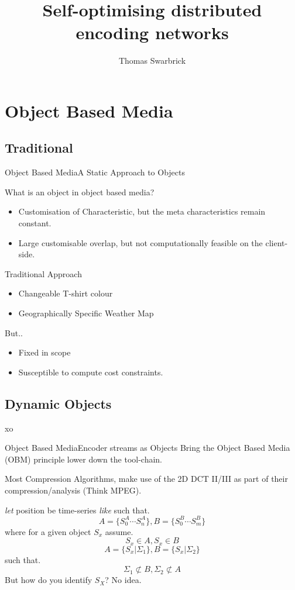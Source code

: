 \documentclass[nocontents]{beamer}
\title{Self-optimising distributed encoding networks}
\author{Thomas Swarbrick}
\begin{document}
\maketitle
\section{Object Based Media}
\subsection{Traditional}
\begin{frame}[t]{Object Based Media}{A Static Approach to Objects}
  \begin{alertblock}{What is an object in object based media?}
    \begin{itemize}
\item Customisation of Characteristic, but the meta characteristics remain constant.
      \item Large customisable overlap, but not computationally feasible on the client-side.
    \end{itemize}

  \end{alertblock}
  \pause
  \begin{exampleblock}{Traditional Approach}
    \begin{itemize}
\item Changeable T-shirt colour
\item Geographically Specific Weather Map
    \end{itemize}

  \end{exampleblock}
  \pause
  But..
  \pause
    \begin{itemize}
\item Fixed in scope
      \item Susceptible to compute cost constraints.
    \end{itemize}
    \pause

\end{frame}
  \subsection{Dynamic Objects}xo
  \begin{frame}[t]{Object Based Media}{Encoder streams as Objects}
    Bring the Object Based Media (OBM) principle lower down the tool-chain.

    Most Compression Algorithms, make use of the 2D DCT II/III as part of their compression/analysis (Think MPEG).
\pause
    \begin{theorem}
      \emph{let} position be time-series \emph{like} such that.
      \[A = \{S^{A}_{0}\cdots S^{A}_{n}\}, B = \{S^{B}_{0}\cdots S^{B}_{m}\}\]
      where for a given object $S_{x}$ assume. \[ S_{x} \in A, S_{x} \in B\]
      \[  A =\{S_{x} | \Sigma_{1} \}, B = \{S_{x} | \Sigma_{2}\}\]
      such that.
      \[\Sigma_{1} \not\subset B, \Sigma_{2} \not\subset A\]
      \pause
     But how do you identify $S_{X}$? No idea.
    \end{theorem}
  \end{frame}
\end{document}
